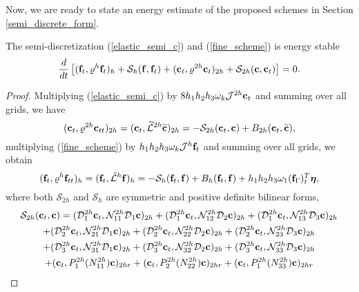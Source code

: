  Now, we are ready to state an energy estimate of the proposed schemes in Section \ref{semi_discrete_form}. 
 \begin{theorem}
  The semi-discretization (\ref{elastic_semi_c}) and (\ref{fine_scheme}) is energy stable 
  \[
  \frac{d}{dt}\left[({\bf f}_t,\varrho^h {\bf f}_t)_{h} + \mathcal{S}_{h}({\bf f},{\bf f}_t) + ({\bf c}_t,\varrho^{2h} {\bf c}_t)_{2h} + \mathcal{S}_{2h}({\bf c},{\bf c}_t) \right]   = 0.
  \]
 \end{theorem}
 \begin{proof}
 Multiplying (\ref{elastic_semi_c}) by $8h_1h_2h_3\omega_k{\mathcal J}^{2h}{\bf c}_t$ and summing over all grids, we have
\begin{equation*}\label{coarse_simple}
({\bf c}_t, {\varrho}^{2h}{\bf c}_{tt})_{2h} = ({\bf c}_t,\wt{\mathcal{L}}^{2h}\wt{{\bf c}})_{2h} = -\mathcal{S}_{2h}({\bf c}_t,{\bf c}) + B_{2h}({\bf c}_t,\wt{{\bf c}}),
\end{equation*}
multiplying (\ref{fine_scheme}) by $h_1h_2h_3\omega_k{\mathcal J}^h{\bf f}_t$ and summing over all grids, we obtain
\begin{equation*}
({\bf f}_t, {\varrho}^h{\bf f}_{tt})_h = ({\bf f}_t,\hat{\mathcal{L}}^h{\bf f})_h = -\mathcal{S}_{h}({\bf f}_t,{\bf f}) + B_h({\bf f}_t,{\bf f}) 
+h_1h_2h_3\omega_1({\bf f}_\Gamma)_t^T{\bm \eta},
\end{equation*}
where  both $\mathcal{S}_{2h}$ and $\mathcal{S}_{h}$ are symmetric and positive definite bilinear forms, 
\begin{multline*}
\mathcal{S}_{2h}({\bf c}_t,{\bf c}) = (\mathcal{D}_1^{2h}{\bf c}_t,\mathcal{N}_{11}^{2h}\mathcal{D}_1{\bf c})_{2h} +  (\mathcal{D}_1^{2h}{\bf c}_t,\mathcal{N}_{12}^{2h}\mathcal{D}_2{\bf c})_{2h} +  (\mathcal{D}_1^{2h}{\bf c}_t,\mathcal{N}_{13}^{2h}\mathcal{D}_3{\bf c})_{2h}\\
 +  (\mathcal{D}_2^{2h}{\bf c}_t,\mathcal{N}_{21}^{2h}\mathcal{D}_1{\bf c})_{2h} 
+  (\mathcal{D}_2^{2h}{\bf c}_t,\mathcal{N}_{22}^{2h}\mathcal{D}_2{\bf c})_{2h} +  (\mathcal{D}_2^{2h}{\bf c}_t,\mathcal{N}_{23}^{2h}\mathcal{D}_3{\bf c})_{2h} \\
+  (\mathcal{D}_3^{2h}{\bf c}_t,\mathcal{N}_{31}^{2h}\mathcal{D}_1{\bf c})_{2h} 
+  (\mathcal{D}_3^{2h}{\bf c}_t,\mathcal{N}_{32}^{2h}\mathcal{D}_2{\bf c})_{2h} +  (\mathcal{D}_3^{2h}{\bf c}_t,\mathcal{N}_{33}^{2h}\mathcal{D}_3{\bf c})_{2h}\\
+ ({\bf c}_t, P^{2h}_1(N_{11}^{2h}){\bf c})_{2hr} + ({\bf c}_t, P^{2h}_2(N_{22}^{2h}){\bf c})_{2hr} + ({\bf c}_t, P^{2h}_1(N_{33}^{2h}){\bf c})_{2hr}

\end{multline*}
\end{proof}
